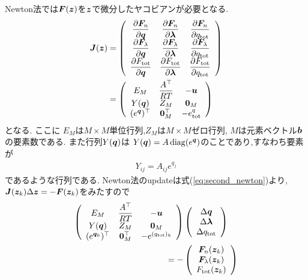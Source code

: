 Newton法では$\boldsymbol{F} (\boldsymbol{z})$を$\boldsymbol{z}$で微分したヤコビアンが必要となる. 
\begin{align}
\label{eq:jacobian_tce}
\boldsymbol{J} (\boldsymbol{z}) &=
\left(
\begin{array}{ccc}
    \dfrac{\partial \boldsymbol{F}_n}{\partial \boldsymbol{q}}  & \dfrac{\partial \boldsymbol{F}_n}{\partial \boldsymbol{\lambda}}& \dfrac{\partial \boldsymbol{F}_n}{\partial q_\mathrm{tot}}\\ 
    \dfrac{\partial \boldsymbol{F}_\lambda}{\partial \boldsymbol{q}} & \dfrac{\partial \boldsymbol{F}_\lambda}{\partial \boldsymbol{\lambda}} & \dfrac{\partial \boldsymbol{F}_\lambda}{\partial q_\mathrm{tot}} \\
    \dfrac{\partial F_\mathrm{tot}}{\partial \boldsymbol{q}} & \dfrac{\partial F_\mathrm{tot}}{\partial \boldsymbol{\lambda}} & \dfrac{\partial F_\mathrm{tot}}{\partial q_\mathrm{tot}} \\  
\end{array}
\right) \nonumber \\
&=
\left(
\begin{array}{ccc}
 E_M &  \dfrac{A^\top}{RT} & - \boldsymbol{u}\\ 
 Y(\boldsymbol{q}) & Z_M & \boldsymbol{0}_M \\ 
 (e^{\boldsymbol{q}})^\top & \boldsymbol{0}_M^\top & - e^q_\mathrm{tot}\\  
\end{array}
\right)
\end{align}
となる. ここに
$E_M$は$M \times M$単位行列,$Z_M$は$M \times M$ゼロ行列, $M$は元素ベクトル$\boldsymbol{b}$の要素数である. また行列$Y(\boldsymbol{q})$は
$Y(\boldsymbol{q})= A \, \mathrm{diag}(e^{\boldsymbol{q}}) $のことであり,すなわち要素が
\begin{align}
Y_{ij} = A_{ij} e^{q_j}
\end{align}
であるような行列である. Newton法のupdateは式(\ref{eq:second_newton})より,$\boldsymbol{J} (\boldsymbol{z}_k) \Delta \boldsymbol{z} = - \boldsymbol{F} (\boldsymbol{z}_k)$をみたすので
\begin{align}
    \left(
\begin{array}{ccc}
 E_M &  \dfrac{A^\top}{RT} & - \boldsymbol{u}\\ 
 Y(\boldsymbol{q}) & Z_M & \boldsymbol{0}_M \\ 
 (e^{{\boldsymbol{q}}_k})^\top & \boldsymbol{0}_M^\top & - e^{(q_\mathrm{tot})_k}\\  
\end{array}
\right)
    &\left(
\begin{array}{c}
\Delta \boldsymbol{q} \\
\Delta \boldsymbol{\lambda} \\
\Delta q_\mathrm{tot}
\end{array}
\right) \nonumber \\
= -
    &\left(
\begin{array}{c}
\boldsymbol{F}_n (\boldsymbol{z}_k) \\
\boldsymbol{F}_\lambda(\boldsymbol{z}_k) \\
F_\mathrm{tot} (\boldsymbol{z}_k)
\end{array}
\right)
\end{align}
